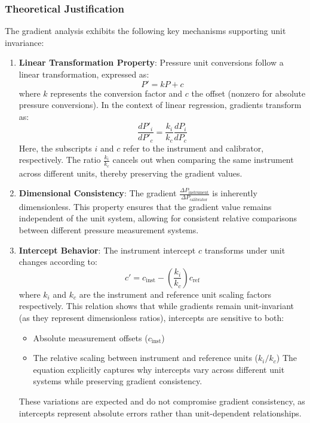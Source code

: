 \documentclass{article}
\begin{document}
\subsubsection{Theoretical Justification}
The gradient analysis exhibits the following key mechanisms supporting unit invariance:
\begin{enumerate}
	\item \textbf{Linear Transformation Property}: 
	Pressure unit conversions follow a linear transformation, expressed as:
	\begin{equation}
		P' = kP + c
	\end{equation}
	where $k$ represents the conversion factor and $c$ the offset (nonzero for absolute pressure conversions). In the context of linear regression, gradients transform as:
	\begin{equation}
		\frac{dP'_i}{dP'_c} = \frac{k_i}{k_c} \frac{dP_i}{dP_c}
	\end{equation}
	Here, the subscripts $i$ and $c$ refer to the instrument and calibrator, respectively. The ratio $\frac{k_i}{k_c}$ cancels out when comparing the same instrument across different units, thereby preserving the gradient values.
	\item \textbf{Dimensional Consistency}: 
	The gradient $\frac{\Delta P_{\text{instrument}}}{\Delta P_{\text{calibrator}}}$ is inherently dimensionless. This property ensures that the gradient value remains independent of the unit system, allowing for consistent relative comparisons between different pressure measurement systems.
	\item \textbf{Intercept Behavior}: The instrument intercept \( c \) transforms under unit changes according to:
	\begin{equation}
		c' = c_{\text{inst}} - \left(\frac{k_i}{k_c}\right)c_{\text{ref}}
	\end{equation}
	where \( k_i \) and \( k_c \) are the instrument and reference unit scaling factors respectively. This relation shows that while gradients remain unit-invariant (as they represent dimensionless ratios), intercepts are sensitive to both:
	\begin{itemize}
		\item Absolute measurement offsets (\( c_{\text{inst}} \))
		\item The relative scaling between instrument and reference units (\( k_i/k_c \)) The equation explicitly captures why intercepts vary across different unit systems while preserving gradient consistency. 
	\end{itemize}
	These variations are expected and do not compromise gradient consistency, as intercepts represent absolute errors rather than unit-dependent relationships.
\end{enumerate}\vspace{-1em}
\end{document}
